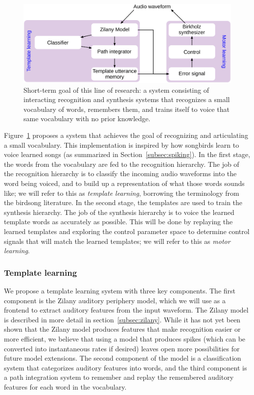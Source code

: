 \documentclass{article}
\begin{document}
\begin{figure}
  \begin{center}
    \includegraphics[width=0.7\linewidth]{shortterm}
  \end{center}
  \caption{Short-term goal of this line of research:
    a system consisting of interacting
    recognition and synthesis systems
    that recognizes a small vocabulary of words,
    remembers them, and trains itself to voice
    that same vocabulary with no prior knowledge.}
  \label{fig:shortterm}
\end{figure}

Figure~\ref{fig:shortterm} proposes a system that
achieves the goal of recognizing
and articulating a small vocabulary.
This implementation is inspired by
how songbirds learn to voice
learned songs
(as summarized in Section~\ref{subsec:spiking}).
In the first stage, the words from
the vocabulary are fed to the
recognition hierarchy.
The job of the recognition hierarchy
is to classify the incoming
audio waveforms into the word
being voiced,
and to build up a representation
of what those words sounds like;
we will refer to this as
\textit{template learning},
borrowing the terminology
from the birdsong literature.
In the second stage, the templates
are used to train the
synthesis hierarchy.
The job of the synthesis hierarchy
is to voice the learned template words
as accurately as possible.
This will be done by replaying
the learned templates and
exploring the control parameter space
to determine control signals
that will match the learned templates;
we will refer to this as
\textit{motor learning}.

\subsubsection{Template learning}
\label{subsec:template-learning}

We propose a template learning system
with three key components.
The first component is the Zilany
auditory periphery model,
which we will use as a frontend
to extract auditory features
from the input waveform.
The Zilany model is described in more detail
in section~\ref{subsec:zilany}.
While it has not yet been shown
that the Zilany model produces features
that make recognition
easier or more efficient,
we believe that using a model
that produces spikes
(which can be converted into
instantaneous rates if desired)
leaves open more possibilities
for future model extensions.
The second component of the model
is a classification system
that categorizes auditory features into words,
and the third component
is a path integration system
to remember and replay the
remembered auditory features
for each word in the vocabulary.
\end{document}
